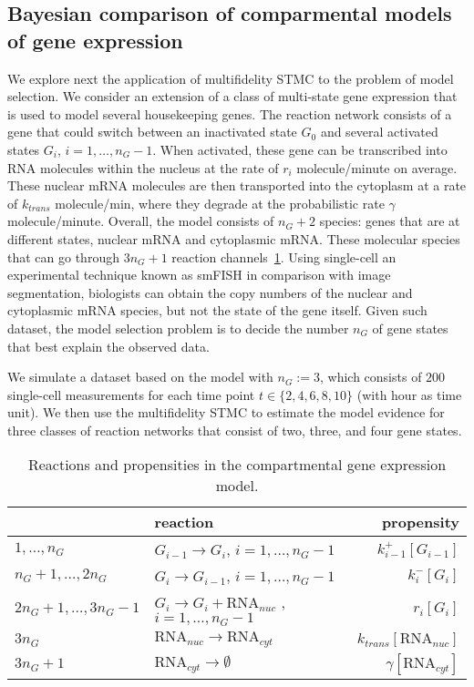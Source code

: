 \documentclass[1p]{article}
\begin{document}
\subsection{Bayesian comparison of comparmental models of gene expression}
We explore next the application of multifidelity STMC to the problem of model selection.
We consider an extension of a class of multi-state gene expression that is used to model several housekeeping genes.
The reaction network consists of a gene that could switch between an inactivated state $G_0$ and several activated states $G_i$, $i=1,\ldots,n_{G}-1$. When activated, these gene can be transcribed into RNA molecules within the nucleus at the rate of $r_{i}$ molecule/minute on average.
These nuclear mRNA molecules are then transported into the cytoplasm at a rate of $k_{trans}$ molecule/min, where they degrade at the probabilistic rate $\gamma$ molecule/minute.
Overall, the model consists of $n_{G} + 2$ species: genes that are at different states, nuclear mRNA and cytoplasmic mRNA. These molecular species that can go through $3n_G + 1$ reaction channels~\ref{table:gene_expression_reactions}.
%
Using single-cell an experimental technique known as smFISH in comparison with image segmentation, biologists can obtain the copy numbers of the nuclear and cytoplasmic mRNA species, but not the state of the gene itself. Given such dataset, the model selection problem is to decide the number $n_{G}$ of gene states that best explain the observed data.

We simulate a dataset based on the model with $n_{G}:=3$, which consists of $200$ single-cell measurements for each time point $t\in \{ 2, 4, 6, 8, 10 \}$ (with hour as time unit). We then use the multifidelity STMC to estimate the model evidence for three classes of reaction networks that consist of two, three, and four gene states.

\begin{table}
  \begin{tabular}{llr}
      \toprule
      & reaction & propensity \\
      \midrule
      $1,\ldots,n_{G} $
      & $G_{i-1} \rightarrow G_{i}$, $i=1,\ldots, n_{G}-1$
      & $k_{i-1}^{+}[G_{i-1}]$
      \\
      $n_{G}+1,\ldots,2n_{G}$
      & $G_{i} \rightarrow G_{i-1}$, $i=1,\ldots,n_{G}-1$
      & $k_{i}^{-}[G_{i}]$
      \\
      $2n_{G}+1, \ldots, 3n_{G}-1$
      & $G_i \rightarrow G_i + \text{RNA}_{nuc}$ , $i = 1,\ldots, n_{G}-1$
      & $r_{i}[G_i]$
      \\
      $3n_{G}$ & $\text{RNA}_{nuc}\rightarrow \text{RNA}_{cyt}$
      & $k_{trans}[\text{RNA}_{nuc}]$
      \\
      $3n_{G}+1$ & $\text{RNA}_{cyt} \rightarrow \emptyset$ & $\gamma[\text{RNA}_{cyt}]$
      \\
      \bottomrule
  \end{tabular}
  \caption{
    Reactions and propensities in the compartmental gene expression model.
  }
  \label{table:gene_expression_reactions}
\end{table}
\end{document}
